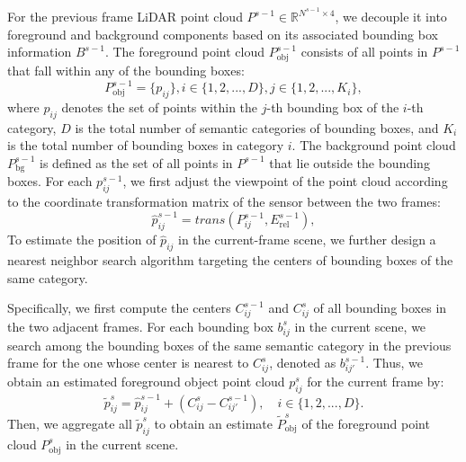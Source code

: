 For the previous frame LiDAR point cloud \( P^{s-1} \in \mathbb{R}^{N^{s-1} \times 4} \), we decouple it into foreground and background components based on its associated bounding box information \( B^{s-1} \). 
The foreground point cloud \( P^{s-1}_{\text{obj}} \) consists of all points in \( P^{s-1} \) that fall within any of the bounding boxes:
\begin{equation}
\label{foreground_estimate}
P^{s-1}_{\text{obj}}=\{p_{ij}\},i \in\{1,2,...,D\}, j \in\{1,2,...,K_i\},
\end{equation}
where \( p_{ij} \) denotes the set of points within the \( j \)-th bounding box of the \( i \)-th category, \( D \) is the total number of semantic categories of bounding boxes, and \( K_i \) is the total number of bounding boxes in category \( i \). 
The background point cloud \( P^{s-1}_{\text{bg}} \) is defined as the set of all points in \( P^{s-1} \) that lie outside the bounding boxes.
For each \( p_{ij}^{s-1} \), we first adjust the viewpoint of the point cloud according to the coordinate transformation matrix of the sensor between the two frames:
\begin{equation}
\label{trans_pij}
\hat{p}_{ij}^{s-1} = trans(P_{ij}^{s-1}, E_{\text{rel}}^{s-1} ),
\end{equation}
To estimate the position of \( \hat{p}_{ij} \) in the current-frame scene, we further design a nearest neighbor search algorithm targeting the centers of bounding boxes of the same category.

Specifically, we first compute the centers \( C_{ij}^{s-1} \) and \( C_{ij}^{s} \) of all bounding boxes in the two adjacent frames. 
For each bounding box \( b_{ij}^{s} \) in the current scene, we search among the bounding boxes of the same semantic category in the previous frame for the one whose center is nearest to \( C_{ij}^{s} \), denoted as \( b_{ij'}^{s-1} \).
Thus, we obtain an estimated foreground object point cloud \( p_{ij}^{s} \) for the current frame by:
\begin{equation}
\label{estimation_foreground}
 \widetilde{p}_{ij}^{s} = \hat{p}_{ij}^{s-1} + (C_{ij}^{s} - C_{ij'}^{s-1}), \quad i \in\{1,2,...,D\}.
\end{equation}
Then, we aggregate all \( \widetilde{p}_{ij}^{s} \) to obtain an estimate \( \widetilde{P}^{s}_{\text{obj}} \) of the foreground point cloud \( P^{s}_{\text{obj}} \) in the current scene.

